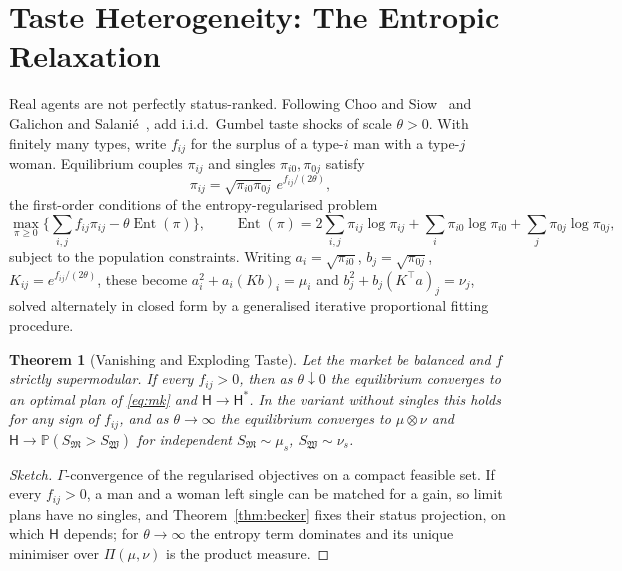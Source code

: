 \documentclass[11pt]{article}
\let\oldsection\section
\renewcommand{\section}{\Needspace{0.25\textheight}\oldsection}
\newtheorem{theorem}{Theorem}[section]
\theoremstyle{definition}
\theoremstyle{remark}
\newcommand{\M}{\mathfrak{M}}
\newcommand{\W}{\mathfrak{W}}
\newcommand{\Hy}{\mathsf{H}}
\DeclareMathOperator{\Ent}{Ent}
\begin{document}
\section{Taste Heterogeneity: The Entropic Relaxation}\label{sec:taste}

Real agents are not perfectly status-ranked. Following Choo and
Siow~\cite{choo} and Galichon and Salani\'e~\cite{galichon}, add
i.i.d.\ Gumbel taste shocks of scale $\theta > 0$. With finitely many
types, write $f_{ij}$ for the surplus of a type-$i$ man with a type-$j$
woman. Equilibrium couples $\pi_{ij}$ and singles $\pi_{i0},\pi_{0j}$
satisfy
\begin{equation}
  \pi_{ij} = \sqrt{\pi_{i0}\pi_{0j}}\,e^{f_{ij}/(2\theta)},
\end{equation}
the first-order conditions of the entropy-regularised problem
\begin{equation}
  \max_{\pi\ge0} \Big\{\sum_{i,j}f_{ij}\pi_{ij} -
  \theta\Ent(\pi)\Big\}, \qquad \Ent(\pi) =
  2\sum_{i,j}\pi_{ij}\log\pi_{ij} + \sum_i\pi_{i0}\log\pi_{i0} +
  \sum_j\pi_{0j}\log\pi_{0j},
\end{equation}
subject to the population constraints. Writing $a_i =
\sqrt{\pi_{i0}}$, $b_j = \sqrt{\pi_{0j}}$, $K_{ij} =
e^{f_{ij}/(2\theta)}$, these become $a_i^2 + a_i(Kb)_i = \mu_i$ and
$b_j^2 + b_j(K^\top a)_j = \nu_j$, solved alternately in closed form
by a generalised iterative proportional fitting procedure.

\begin{theorem}[Vanishing and Exploding Taste]\label{thm:taste}
  Let the market be balanced and $f$ strictly supermodular. If every
  $f_{ij} > 0$, then as $\theta\downarrow0$ the equilibrium converges
  to an optimal plan of \eqref{eq:mk} and $\Hy\to\Hy^*$. In the variant
  without singles this holds for any sign of $f_{ij}$, and as
  $\theta\to\infty$ the equilibrium converges to $\mu\otimes\nu$ and
  $\Hy\to\mathbb{P}(S_\M > S_\W)$ for independent $S_\M\sim\mu_s$,
  $S_\W\sim\nu_s$.
\end{theorem}

\begin{proof}[Sketch]
  $\Gamma$-convergence of the regularised objectives on a compact
  feasible set. If every $f_{ij} > 0$, a man and a woman left single
  can be matched for a gain, so limit plans have no singles, and
  Theorem~\ref{thm:becker} fixes their status projection, on which
  $\Hy$ depends; for $\theta\to\infty$ the entropy term dominates and
  its unique minimiser over $\Pi(\mu,\nu)$ is the product measure.
\end{proof}
\end{document}
